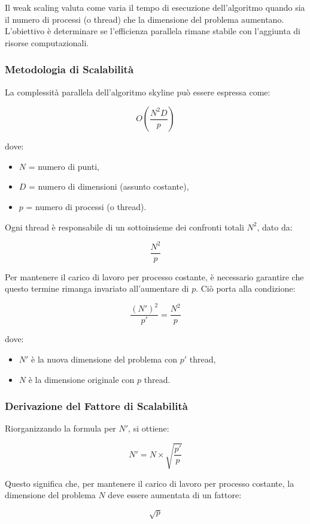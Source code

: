 \documentclass[letterpaper,11pt,leqno]{article}
\begin{document}
Il weak scaling valuta come varia il tempo di esecuzione dell'algoritmo quando sia il numero di processi (o thread) che la dimensione del problema aumentano. L'obiettivo è determinare se l'efficienza parallela rimane stabile con l'aggiunta di risorse computazionali.

\subsubsection{Metodologia di Scalabilità}
La complessità parallela dell'algoritmo skyline può essere espressa come:

\[
O\left(\frac{N^2 D}{p}\right)
\]

dove:
\begin{itemize}
    \item \( N \) = numero di punti,
    \item \( D \) = numero di dimensioni (assunto costante),
    \item \( p \) = numero di processi (o thread).
\end{itemize}

Ogni thread è responsabile di un sottoinsieme dei confronti totali \( N^2 \), dato da:

\[
\frac{N^2}{p}
\]

Per mantenere il carico di lavoro per processo costante, è necessario garantire che questo termine rimanga invariato all'aumentare di \( p \). Ciò porta alla condizione:

\[
\frac{(N')^2}{p'} = \frac{N^2}{p}
\]

dove:
\begin{itemize}
    \item \( N' \) è la nuova dimensione del problema con \( p' \) thread,
    \item \( N \) è la dimensione originale con \( p \) thread.
\end{itemize}

\subsubsection{Derivazione del Fattore di Scalabilità}
Riorganizzando la formula per \( N' \), si ottiene:

\[
N' = N \times \sqrt{\frac{p'}{p}}
\]

Questo significa che, per mantenere il carico di lavoro per processo costante, la dimensione del problema \( N \) deve essere aumentata di un fattore:

\[
\sqrt{p}
\]
\end{document}
